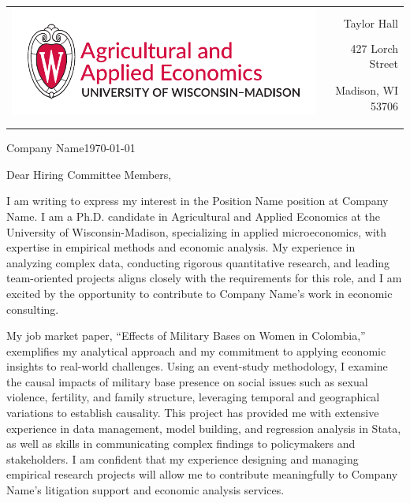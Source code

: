 \documentclass[12pt]{letter}
\begin{document}
\begin{tabularx}{\textwidth}{Xr}
\multirow{4}{*}{\includegraphics[height=3\baselineskip]{logo_cropped.pdf}} &  \\
& Taylor Hall \\
& 427 Lorch Street \\
& Madison, WI 53706 \\
[-1.8ex]\\
\\
\end{tabularx}

\newcommand{\compName}{Company Name}
\newcommand{\posName}{Position Name}

\compName \hfill \today \\

\medskip

Dear Hiring Committee Members,

I am writing to express my interest in the \posName \vspace{1mm} position at \compName. 
I am a Ph.D. candidate in Agricultural and Applied Economics at the University of Wisconsin-Madison, specializing in applied microeconomics, 
with expertise in empirical methods and economic analysis. My experience in analyzing complex data, conducting rigorous quantitative research, 
and leading team-oriented projects aligns closely with the requirements for this role, and I am excited by the opportunity to contribute 
to \compName's work in economic consulting.

My job market paper, “Effects of Military Bases on Women in Colombia,” exemplifies my analytical approach and my commitment to 
applying economic insights to real-world challenges. Using an event-study methodology, I examine the causal impacts of military base presence 
on social issues such as sexual violence, fertility, and family structure, leveraging temporal and geographical variations to establish causality. 
This project has provided me with extensive experience in data management, model building, and regression analysis in Stata, as well as skills 
in communicating complex findings to policymakers and stakeholders. I am confident that my experience designing and managing empirical research projects 
will allow me to contribute meaningfully to \compName's litigation support and economic analysis services.
\end{document}
